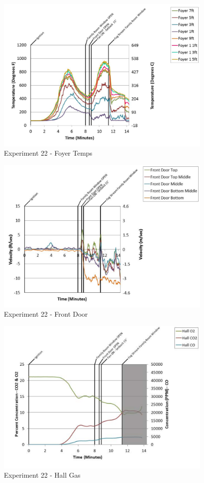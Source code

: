 \documentclass{article}
\begin{document}
\begin{appendices}
	\clearpage

	\begin{figure}[h!]
		\centering
		\includegraphics[height=3.05in]{0_Images/Results_Charts/Exp_22_Charts/FoyerTemps.pdf}
		\caption{Experiment 22 - Foyer Temps}
	\end{figure}
 

	\begin{figure}[h!]
		\centering
		\includegraphics[height=3.05in]{0_Images/Results_Charts/Exp_22_Charts/FrontDoor.pdf}
		\caption{Experiment 22 - Front Door}
	\end{figure}
 
	\clearpage

	\begin{figure}[h!]
		\centering
		\includegraphics[height=3.05in]{0_Images/Results_Charts/Exp_22_Charts/HallGas.pdf}
		\caption{Experiment 22 - Hall Gas}
	\end{figure}
 


\end{appendices}
\end{document}

